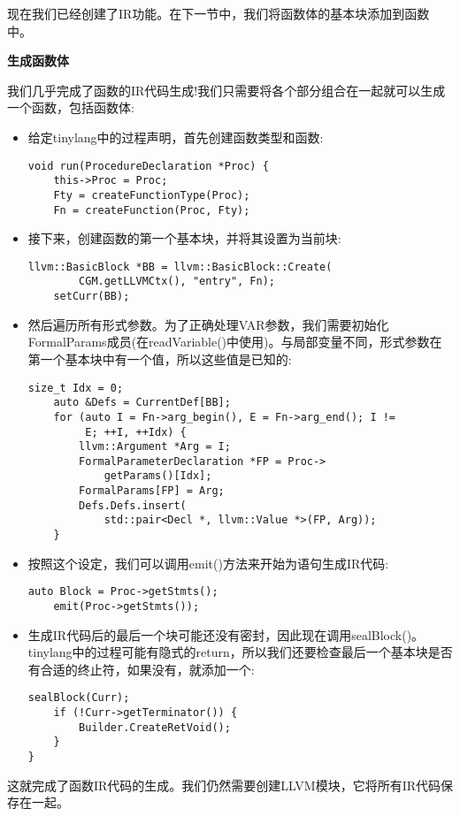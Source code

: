现在我们已经创建了IR功能。在下一节中，我们将函数体的基本块添加到函数中。\par

\hspace*{\fill} \par %
\textbf{生成函数体}

我们几乎完成了函数的IR代码生成!我们只需要将各个部分组合在一起就可以生成一个函数，包括函数体:\par

\begin{itemize}
\item 给定tinylang中的过程声明，首先创建函数类型和函数:
\begin{lstlisting}[caption={}]
void run(ProcedureDeclaration *Proc) {
	this->Proc = Proc;
	Fty = createFunctionType(Proc);
	Fn = createFunction(Proc, Fty);
\end{lstlisting}

\item 接下来，创建函数的第一个基本块，并将其设置为当前块:
\begin{lstlisting}[caption={}]
	llvm::BasicBlock *BB = llvm::BasicBlock::Create(
		CGM.getLLVMCtx(), "entry", Fn);
	setCurr(BB);
\end{lstlisting}

\item 然后遍历所有形式参数。为了正确处理VAR参数，我们需要初始化FormalParams成员(在readVariable()中使用)。与局部变量不同，形式参数在第一个基本块中有一个值，所以这些值是已知的:
\begin{lstlisting}[caption={}]
	size_t Idx = 0;
	auto &Defs = CurrentDef[BB];
	for (auto I = Fn->arg_begin(), E = Fn->arg_end(); I !=
		 E; ++I, ++Idx) {
		llvm::Argument *Arg = I;
		FormalParameterDeclaration *FP = Proc->
			getParams()[Idx];
		FormalParams[FP] = Arg;
		Defs.Defs.insert(
			std::pair<Decl *, llvm::Value *>(FP, Arg));
	}
\end{lstlisting}

\item 按照这个设定，我们可以调用emit()方法来开始为语句生成IR代码:
\begin{lstlisting}[caption={}]
	auto Block = Proc->getStmts();
	emit(Proc->getStmts());
\end{lstlisting}

\item 生成IR代码后的最后一个块可能还没有密封，因此现在调用sealBlock()。tinylang中的过程可能有隐式的return，所以我们还要检查最后一个基本块是否有合适的终止符，如果没有，就添加一个:
\begin{lstlisting}[caption={}]
	sealBlock(Curr);
	if (!Curr->getTerminator()) {
		Builder.CreateRetVoid();
	}
}
\end{lstlisting}

\end{itemize}

这就完成了函数IR代码的生成。我们仍然需要创建LLVM模块，它将所有IR代码保存在一起。\par




